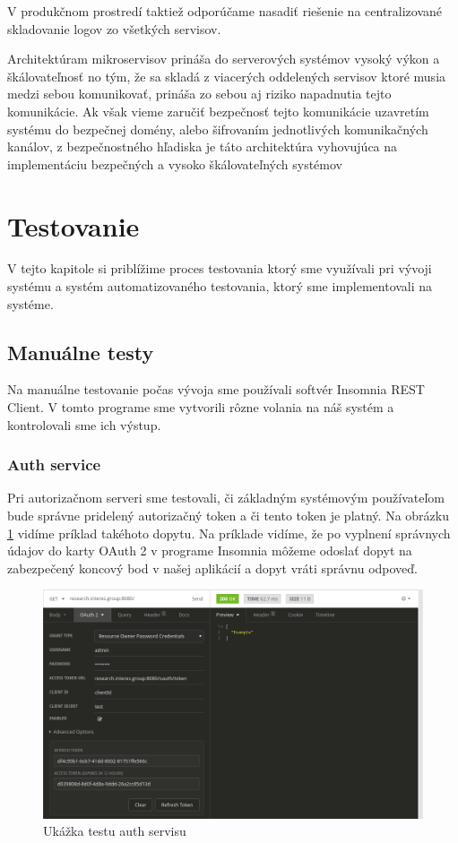 V produkčnom prostredí taktiež odporúčame nasadiť riešenie na centralizované skladovanie logov zo všetkých servisov.

Architektúram mikroservisov prináša do serverových systémov vysoký výkon a škálovateľnosť no tým, že sa skladá z viacerých oddelených servisov ktoré musia medzi sebou komunikovať, prináša zo sebou aj riziko napadnutia tejto komunikácie. Ak však vieme zaručiť bezpečnosť tejto komunikácie uzavretím systému do bezpečnej domény, alebo šifrovaním jednotlivých komunikačných kanálov, z bezpečnostného hľadiska je táto architektúra vyhovujúca na  implementáciu bezpečných a vysoko škálovateľných systémov


\section{Testovanie}
V tejto kapitole si priblížime proces testovania ktorý sme využívali pri vývoji systému a systém automatizovaného testovania, ktorý sme implementovali na systéme.

\subsection{Manuálne testy}

Na manuálne testovanie počas vývoja sme používali softvér Insomnia REST Client\cite{insomnia}. V tomto programe sme vytvorili rôzne volania na náš systém a kontrolovali sme ich výstup.

\subsubsection{Auth service}
Pri autorizačnom serveri sme testovali, či základným systémovým používateľom bude správne pridelený autorizačný token a či tento token je platný. Na obrázku \ref{insomnia_oauth} vidíme príklad takéhoto dopytu. Na príklade vidíme, že po vyplnení správnych údajov do karty OAuth 2 v programe Insomnia môžeme odoslať dopyt na zabezpečený koncový bod v našej aplikácií a dopyt vráti správnu odpoveď.
\begin{figure}[!htbp]
	\centering
	\includegraphics[width=16cm]{img/insomnia_oauth.png}
	\caption{Ukážka testu auth servisu}
	\label{insomnia_oauth}
\end{figure}

